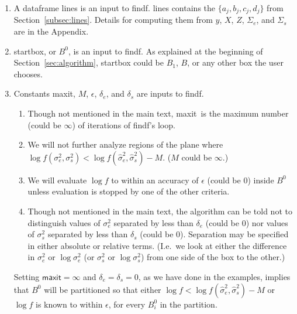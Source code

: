 \documentclass[ejs]{imsart}
\newcommand{\textcompute}{\textsf}
\newcommand{\RL}{f}
\newcommand{\logRL}{\log\RL}
\newcommand{\sigssq}{\sigma_s^2}
\newcommand{\sigesq}{\sigma_e^2}
\newcommand{\sshat}{\hat\sigma^2_e,\hat\sigma^2_s}
\newcommand{\logRLss}{\logRL(\sigesq,\sigssq)}
\newcommand{\maxit}{\textcompute{maxit}}
\begin{document}
\begin{enumerate}
\item A dataframe \textcompute{lines} is an input to \textcompute{findf}.  \textcompute{lines} contains the
  $\{a_j, b_j, c_j, d_j \}$ from Section~\ref{subsec:lines}.
  Details for computing them from $y$, $X$, $Z$, $\Sigma_e$, and $\Sigma_s$ are in the Appendix.
\item \textcompute{startbox}, or $B^0$, is an input to \textcompute{findf}.  As explained at the beginning of
  Section~\ref{sec:algorithm}, \textcompute{startbox} could be $B_1$, $B$, or any other box the user chooses.
\item Constants \maxit, $M$, $\epsilon$, $\delta_e$, and $\delta_s$ are inputs to \textcompute{findf}.
	\begin{enumerate}[label=(\alph*)]
	\item Though not mentioned in the main text, \maxit\ is the maximum number (could be $\infty$) of iterations of
		\textcompute{findf}'s loop.
	\item We will not further analyze regions of the plane where
		$\logRLss < \logRL(\sshat) - M$.  ($M$ could be $\infty$.)
	\item We will evaluate $\logRL$ to within an accuracy of $\epsilon$ (could be 0) inside $B^0$
	         unless evaluation is stopped by one of the other criteria.
	\item Though not mentioned in the main text, the algorithm can be told not
		to distinguish values of $\sigesq$ separated by less
		than $\delta_e$ (could be 0) nor values of $\sigssq$ separated by
		less than $\delta_s$ (could be 0).  Separation may be specified
		in either absolute or relative terms. (I.e.\ we look at either the difference
		in $\sigesq$ or $\log\sigesq$ (or $\sigssq$ or $\log\sigssq$) from one
		side of the box to the other.)
	\end{enumerate}
  Setting $\maxit = \infty$ and $\delta_e = \delta_s = 0$, as we have done in the examples, implies
  that $B^0$ will be partitioned so that either
  $\logRL < \logRL(\sshat) - M$ or $\logRL$ is known to within $\epsilon$, for every $B^0_i$ in the partition.
  

\end{enumerate}
\end{document}
